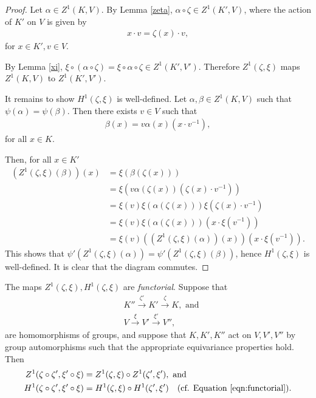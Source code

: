 \begin{proof}
	Let $\alpha \in Z^1(K, V)$. By Lemma \ref{zeta}, $\alpha \circ \zeta \in Z^1(K', V)$, where the action of $K'$ on $V$ is given by
	\begin{align*}
		x\cdot v = \zeta(x)\cdot v,
	\end{align*}
	for $x\in K', v\in V$.
	
	By Lemma \ref{xi}, $\xi \circ \left(\alpha \circ \zeta\right) = \xi \circ \alpha \circ \zeta \in Z^1(K', V')$. Therefore $Z^1(\zeta, \xi)$ maps $Z^1(K, V)$ to $Z^1(K', V')$.

	It remains to show $H^1(\zeta, \xi)$ is well-defined. Let $\alpha,\beta \in Z^1(K, V)$ such that $\psi(\alpha) = \psi(\beta)$. Then there exists $v \in V$ such that
	\begin{align*}
		\beta(x) = v\alpha(x)(x \cdot v^{-1}),
	\end{align*}
	for all $x \in K$.

	Then, for all $x \in K'$
	\begin{align*}
		\left(Z^1(\zeta, \xi)(\beta)\right)(x) &= \xi\left(\beta(\zeta(x))\right) \\
			&= \xi \left( v \alpha(\zeta(x))\left(\zeta(x) \cdot v^{-1}\right) \right) \\
			&= \xi(v) \xi(\alpha(\zeta(x))) \xi\left( \zeta(x) \cdot v^{-1}\right) \\
			&= \xi(v) \xi(\alpha(\zeta(x)))\left(x \cdot \xi(v^{-1})\right) \\
			&= \xi(v) \left(\left(Z^1(\zeta, \xi)(\alpha)\right)(x)\right) \left(x \cdot \xi(v^{-1})\right).
	\end{align*}
	This shows that $\psi'\left(Z^1(\zeta, \xi)(\alpha)\right) = \psi'\left(Z^1(\zeta, \xi)(\beta)\right)$, hence $H^1(\zeta, \xi)$ is well-defined. It is clear that the diagram commutes.
\end{proof} 
\begin{remark} \label{maps_functorial}
 The maps $Z^1(\zeta, \xi), H^1(\zeta, \xi)$ are \emph{functorial}. Suppose that
\begin{align*}
	&K'' \stackrel{\zeta'}\longrightarrow K' \stackrel{\zeta}\longrightarrow K, \textrm{ and} \\
	&V \stackrel{\xi}\longrightarrow V' \stackrel{\xi'}\longrightarrow V'',
\end{align*}
are homomorphisms of groups, and suppose that $K, K', K''$ act on $V, V', V''$ by group automorphisms such that the appropriate equivariance properties hold. Then
\begin{align*}
Z^1(\zeta \circ \zeta', \xi' \circ \xi) &= Z^1(\zeta, \xi) \circ Z^1(\zeta', \xi'), \textrm{ and} \\
H^1(\zeta \circ \zeta', \xi' \circ \xi) &= H^1(\zeta, \xi) \circ H^1(\zeta', \xi')\quad(\textrm{cf. Equation \ref{eqn:functorial}}).
\end{align*}
\end{remark}
